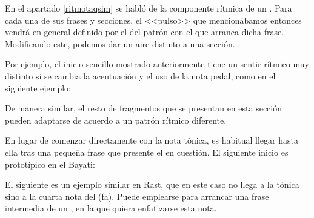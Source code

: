 En el apartado \ref{ritmotaqsim} se habló de la componente rítmica de un \taqsimb. Para cada una de sus frases y secciones, el <<pulso>> que mencionábamos entonces vendrá en general definido por el del patrón con el que arranca dicha frase. Modificando este, podemos dar un aire distinto a una sección.

Por ejemplo, el inicio sencillo mostrado anteriormente tiene un sentir rítmico muy distinto si se cambia la acentuación y el uso de la nota pedal, como en el siguiente ejemplo:


\begin{center}
\end{center}



De manera similar, el resto de fragmentos que se presentan en esta sección pueden adaptarse de acuerdo a un patrón rítmico diferente.

En lugar de comenzar directamente con la nota tónica, es habitual llegar hasta ella tras una pequeña frase que presente el \yins en cuestión. El siguiente inicio es prototípico en el \maqam Bayati:


\begin{center}
\end{center}



El siguiente es un ejemplo similar en \maqam Rast, que en este caso no llega a la tónica sino a la cuarta nota del \maqam (fa). Puede emplearse para arrancar una frase intermedia de un \taqsimb, en la que quiera enfatizarse esta nota.


